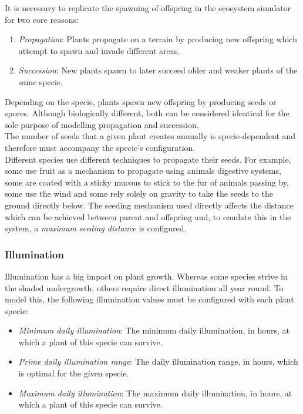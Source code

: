 It is necessary to replicate the spawning of offspring in the ecosystem simulator for two core reasons: 
\begin{enumerate}
\item \textit{Propagation}: Plants propagate on a terrain by producing new offspring which attempt to spawn and invade different areas. 
\item \textit{Succession}: New plants spawn to later succeed older and weaker plants of the same specie. 
\end{enumerate}

Depending on the specie, plants spawn new offspring by producing seeds or spores. Although biologically different, both can be considered identical for the sole purpose of modelling propagation and succession.\\

The number of seeds that a given plant creates annually is specie-dependent and therefore must accompany the specie's configuration.\\

Different species use different techniques to propagate their seeds. For example, some use fruit as a mechanism to propagate using animals digestive systems, some are coated with a sticky mucous to stick to the fur of animals passing by, some use the wind and some rely solely on gravity to take the seeds to the ground directly below. The seeding mechanism used directly affects the distance which can be achieved between parent and offspring and, to emulate this in the system, a \textit{maximum seeding distance} is configured.

\subsubsection{Illumination}

Illumination has a big impact on plant growth. Whereas some species strive in the shaded undergrowth, others require direct illumination all year round. To model this, the following illumination values must be configured with each plant specie:

\begin{itemize}
\item \textit{Minimum daily illumination}: The minimum daily illumination, in hours, at which a plant of this specie can survive.
\item \textit{Prime daily illumination range}: The daily illumination range, in hours, which is optimal for the given specie.
\item \textit{Maximum daily illumination}: The maximum daily illumination, in hours, at which a plant of this specie can survive.
\end{itemize}

